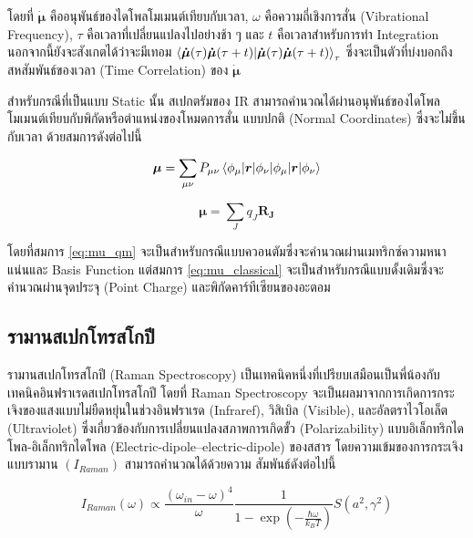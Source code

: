 \noindent โดยที่ $\bm{\dot{\mu}}$ คืออนุพันธ์ของไดโพลโมเมนต์เทียบกับเวลา, $\omega$ คือความถี่เชิงการสั่น (Vibrational Frequency),
$\tau$ คือเวลาที่เปลี่ยนแปลงไปอย่างช้า ๆ และ $t$ คือเวลาสำหรับการทำ Integration นอกจากนี้ยังจะสังเกตได้ว่าจะมีเทอม
$\braket{\bm{\dot{\mu}}(\tau) \bm{\dot{\mu}}(\tau+t)}_{\tau}$ ซึ่งจะเป็นตัวที่บ่งบอกถึงสหสัมพันธ์ของเวลา (Time Correlation)
ของ $\bm{\dot{\mu}}$

สำหรับกรณีที่เป็นแบบ Static นั้น สเปกตรัมของ IR สามารถคำนวณได้ผ่านอนุพันธ์ของไดโพลโมเมนต์เทียบกับพิกัดหรือตำแหน่งของโหมดการสั่น%
แบบปกติ (Normal Coordinates) ซึ่งจะไม่ขึ้นกับเวลา ด้วยสมการดังต่อไปนี้

\begin{equation}\label{eq:mu_qm}
    \bm{\mu} = \sum_{\mu\nu} P_{\mu\nu} \braket{\phi_{\mu}|\bm{r}|\phi_{\nu}}
\end{equation}

\begin{equation}\label{eq:mu_classical}
    \bm{\mu} = \sum_{J} q_J \bm{R_J}
\end{equation}

โดยที่สมการ \eqref{eq:mu_qm} จะเป็นสำหรับกรณีแบบควอนตัมซึ่งจะคำนวณผ่านเมทริกซ์ความหนาแน่นและ Basis Function แต่สมการ
\eqref{eq:mu_classical} จะเป็นสำหรับกรณีแบบดั้งเดิมซึ่งจะคำนวณผ่านจุดประจุ (Point Charge) และพิกัดคาร์ทีเซียนของอะตอม

\subsection{รามานสเปกโทรสโกปี}
\label{ssec:raman_spectro}

รามานสเปกโทรสโกปี (Raman Spectroscopy) เป็นเทคนิคหนึ่งที่เปรียบเสมือนเป็นพี่น้องกับเทคนิคอินฟราเรดสเปกโทรสโกปี โดยที่ Raman
Spectroscopy จะเป็นผลมาจากการเกิดการกระเจิงของแสงแบบไม่ยืดหยุ่นในช่วงอินฟราเรด (Infraref), วิสิเบิล (Visible), และอัลตราไวโอเล็ต
(Ultraviolet) ซึ่งเกี่ยวข้องกับการเปลี่ยนแปลงสภาพการเกิดขั้ว (Polarizability) แบบอิเล็กทริกไดโพล-อิเล็กทริกไดโพล
(Electric-dipole--electric-dipole) ของสสาร โดยความเข้มของการกระเจิงแบบรามาน $(I_{Raman})$ สามารถคำนวณได้ด้วยความ%
สัมพันธ์ดังต่อไปนี้\autocite{thomas2013}

\begin{equation}\label{eq:Raman_corr}
    I_{Raman} (\omega) \propto \frac{(\omega_{in}-\omega)^4}{\omega}
    \frac{1}{1-\exp(-\frac{\hbar\omega}{k_{B}T})}S(a^{2}, \gamma^{2})
\end{equation}

